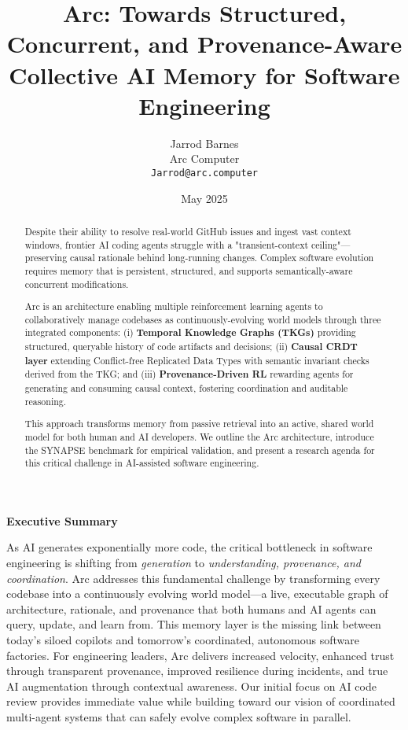 \documentclass{article}
\title{Arc: Towards Structured, Concurrent, and Provenance-Aware Collective AI Memory for Software Engineering}
\author{%
  Jarrod Barnes\\
  Arc Computer\\
  \texttt{Jarrod@arc.computer}
}
\date{May 2025}
\begin{document}
\maketitle

\begin{center}
\large\textbf{Executive Summary}
\end{center}
\noindent As AI generates exponentially more code, the critical bottleneck in software engineering is shifting from \textit{generation} to \textit{understanding, provenance, and coordination}. Arc addresses this fundamental challenge by transforming every codebase into a continuously evolving world model—a live, executable graph of architecture, rationale, and provenance that both humans and AI agents can query, update, and learn from. This memory layer is the missing link between today's siloed copilots and tomorrow's coordinated, autonomous software factories. For engineering leaders, Arc delivers increased velocity, enhanced trust through transparent provenance, improved resilience during incidents, and true AI augmentation through contextual awareness. Our initial focus on AI code review provides immediate value while building toward our vision of coordinated multi-agent systems that can safely evolve complex software in parallel.

\vspace{0.5cm}
\begin{abstract}
Despite their ability to resolve real-world GitHub issues and ingest vast context windows, frontier AI coding agents struggle with a "transient-context ceiling"—preserving causal rationale behind long-running changes. Complex software evolution requires memory that is persistent, structured, and supports semantically-aware concurrent modifications.

Arc is an architecture enabling multiple reinforcement learning agents to collaboratively manage codebases as continuously-evolving world models through three integrated components: (i) \textbf{Temporal Knowledge Graphs (TKGs)} providing structured, queryable history of code artifacts and decisions; (ii) \textbf{Causal CRDT layer} extending Conflict-free Replicated Data Types with semantic invariant checks derived from the TKG; and (iii) \textbf{Provenance-Driven RL} rewarding agents for generating and consuming causal context, fostering coordination and auditable reasoning.

This approach transforms memory from passive retrieval into an active, shared world model for both human and AI developers. We outline the Arc architecture, introduce the SYNAPSE benchmark for empirical validation, and present a research agenda for this critical challenge in AI-assisted software engineering.
\end{abstract}
\end{document}
